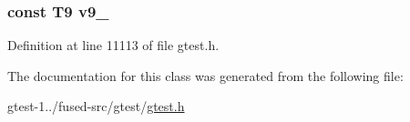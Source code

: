 \hypertarget{classtesting_1_1internal_1_1ValueArray17_a6356e16cf54a9dfac8525f20242af31e}{
\subsubsection[{v9\-\_\-}]{\setlength{\rightskip}{0pt plus 5cm}const \-T9 {\bf v9\-\_\-}}}\label{df/d24/classtesting_1_1internal_1_1ValueArray17_a6356e16cf54a9dfac8525f20242af31e}


\-Definition at line 11113 of file gtest.\-h.



\-The documentation for this class was generated from the following file\-:\begin{DoxyCompactItemize}
\item 
gtest-\/1../fused-\/src/gtest/\hyperlink{fused-src_2gtest_2gtest_8h}{gtest.\-h}\end{DoxyCompactItemize}
